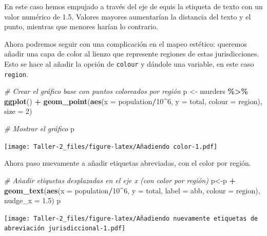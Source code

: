 \documentclass[
]{article}
\newenvironment{Shaded}{\begin{snugshade}}{\end{snugshade}}
\newcommand{\AttributeTok}[1]{\textcolor[rgb]{0.13,0.29,0.53}{#1}}
\newcommand{\CommentTok}[1]{\textcolor[rgb]{0.56,0.35,0.01}{\textit{#1}}}
\newcommand{\DecValTok}[1]{\textcolor[rgb]{0.00,0.00,0.81}{#1}}
\newcommand{\FloatTok}[1]{\textcolor[rgb]{0.00,0.00,0.81}{#1}}
\newcommand{\FunctionTok}[1]{\textcolor[rgb]{0.13,0.29,0.53}{\textbf{#1}}}
\newcommand{\NormalTok}[1]{#1}
\newcommand{\OtherTok}[1]{\textcolor[rgb]{0.56,0.35,0.01}{#1}}
\newcommand{\SpecialCharTok}[1]{\textcolor[rgb]{0.81,0.36,0.00}{\textbf{#1}}}
\begin{document}
En este caso hemos empujado a través del eje de equis la etiqueta de
texto con un valor numérico de 1.5. Valores mayores aumentarían la
distancia del texto y el punto, mientras que menores harían lo
contrario.

Ahora podremos seguir con una complicación en el mapeo estético:
queremos añadir una capa de color al lienzo que represente regiones de
estas jurisdicciones. Esto se hace al añadir la opción de
\texttt{colour} y dándole una variable, en este caso \texttt{region}.

\begin{Shaded}
\begin{Highlighting}[]
\CommentTok{\# Crear el gráfico base con puntos coloreados por región}
\NormalTok{p }\OtherTok{\textless{}{-}}\NormalTok{ murders }\SpecialCharTok{\%\textgreater{}\%}
  \FunctionTok{ggplot}\NormalTok{() }\SpecialCharTok{+}
  \FunctionTok{geom\_point}\NormalTok{(}\FunctionTok{aes}\NormalTok{(}\AttributeTok{x =}\NormalTok{ population}\SpecialCharTok{/}\DecValTok{10}\SpecialCharTok{\^{}}\DecValTok{6}\NormalTok{, }\AttributeTok{y =}\NormalTok{ total, }\AttributeTok{colour =}\NormalTok{ region), }\AttributeTok{size =} \DecValTok{2}\NormalTok{)}

\CommentTok{\# Mostrar el gráfico}
\NormalTok{p}
\end{Highlighting}
\end{Shaded}

\texttt{[image: Taller-2\_files/figure-latex/Añadiendo color-1.pdf]}

Ahora paso nuevamente a añadir etiquetas abreviadas, con el color por
región.

\begin{Shaded}
\begin{Highlighting}[]
\CommentTok{\# Añadir etiquetas desplazadas en el eje x (con color por región)}
\NormalTok{p}\OtherTok{\textless{}{-}}\NormalTok{p }\SpecialCharTok{+} 
  \FunctionTok{geom\_text}\NormalTok{(}\FunctionTok{aes}\NormalTok{(}\AttributeTok{x =}\NormalTok{ population}\SpecialCharTok{/}\DecValTok{10}\SpecialCharTok{\^{}}\DecValTok{6}\NormalTok{, }\AttributeTok{y =}\NormalTok{ total, }\AttributeTok{label =}\NormalTok{ abb, }\AttributeTok{colour =}\NormalTok{ region), }\AttributeTok{nudge\_x =} \FloatTok{1.5}\NormalTok{)}
\NormalTok{p}
\end{Highlighting}
\end{Shaded}

\texttt{[image: Taller-2\_files/figure-latex/Añadiendo nuevamente etiquetas de abreviación jurisdiccional-1.pdf]}
\end{document}
